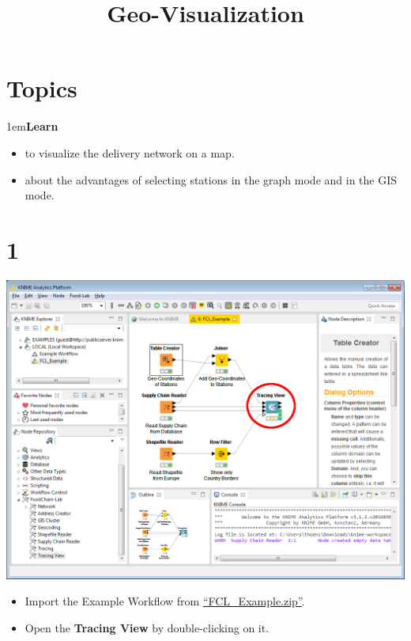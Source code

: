 \documentclass[10pt]{beamer}
\title{Geo-Visualization}
\date{}
\begin{document}
\maketitle

\section{Topics}
\begin{frame}
\leftskip1em\textbf{Learn}
	\begin{itemize}
    \item to visualize the delivery network on a map.
		\item about the advantages of selecting stations in the graph mode and in the GIS mode.
	\end{itemize}
\end{frame}

\section{1}
\begin{frame}
	\begin{center}
  		\includegraphics[height=0.6\textheight]{1.png}
	\end{center}
	\begin{itemize}
		\item Import the Example Workflow from \textcolor{blue}{\underline{\href{https://github.com/SiLeBAT/BfROpenLabResources/raw/master/GitHubPages/workflows/FCL\_Example.zip}{``FCL\_Example.zip''}}}.
		\item Open the \textbf{Tracing View} by double-clicking on it.
	\end{itemize}
\end{frame}
\end{document}
